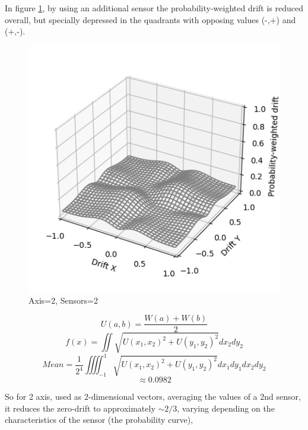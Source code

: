 \documentclass[10pt, twocolumn, a4paper]{article}
\begin{document}
            In figure \ref{fig_zero_22}, by using an additional sensor the probability-weighted drift is reduced overall, but specially depressed in the quadrants with opposing values (-,+) and (+,-).
            \begin{figure}[H]
                \begin{center}
                    \caption{Axis=2, Sensors=2}
                    \label{fig_zero_22}
                    \includegraphics[width=0.8\linewidth]{multiple_ars/figure_drift_4.png}
                \end{center}
            \end{figure}
            \vspace{-8mm}
            $$ U(a, b) = \frac{W(a)+W(b)}{2} $$
            $$
                f(x) = \iint \sqrt{
                    U(x_1, x_2)^2 +
                    U(y_1, y_2)^2
                } dx_2 dy_2
            $$
            $$
                Mean = \frac{1}{2^4} \iiiint_{-1}^1 \sqrt{
                    U(x_1, x_2)^2 +
                    U(y_1, y_2)^2
                } dx_1 dy_1 dx_2 dy_2
            $$
            $$ \approx 0.0982 $$

            \pagebreak
            So for 2 axis, used as 2-dimensional vectors, averaging the values of a 2nd sensor, it reduces the zero-drift to approximately $ \sim 2/3 $, varying depending on the characteristics of the sensor (the probability curve),
\end{document}
